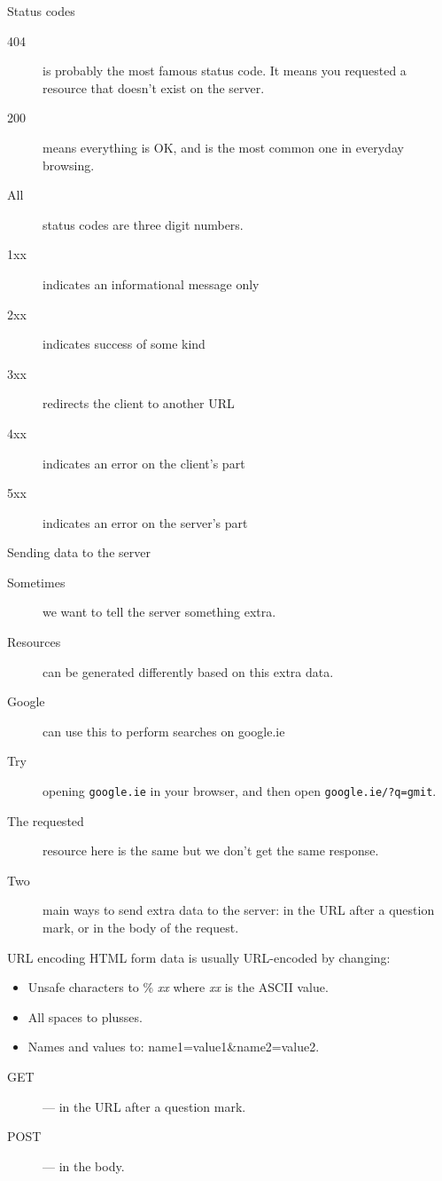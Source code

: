 \begin{frame}{Status codes}
  \begin{description}
    \item[404] is probably the most famous status code. It means you requested a resource that doesn't exist on the server.
    \item[200] means everything is OK, and is the most common one in everyday browsing.
    \item[All] status codes are three digit numbers.
    \item[1xx] indicates an informational message only
    \item[2xx] indicates success of some kind
    \item[3xx] redirects the client to another URL
    \item[4xx] indicates an error on the client's part
    \item[5xx] indicates an error on the server's part
  \end{description}
\end{frame}


\begin{frame}{Sending data to the server}
  \begin{description}
    \item[Sometimes] we want to tell the server something extra.
    \item[Resources] can be generated differently based on this extra data.
    \item[Google] can use this to perform searches on google.ie
    \item[Try] opening \texttt{google.ie} in your browser, and then open \texttt{google.ie/?q=gmit}.
    \item[The requested] resource here is the same but we don't get the same response.
    \item[Two] main ways to send extra data to the server: in the URL after a question mark, or in the body of the request.
  \end{description}
\end{frame}


\begin{frame}{URL encoding}
  HTML form data is usually URL-encoded by changing:
  \begin{itemize}
    \item Unsafe characters to \% \emph{xx} where \emph{xx} is the ASCII value.
    \item All spaces to plusses.
    \item Names and values to: name1=value1\&name2=value2.
  \end{itemize}
  \hr
  \begin{description}
    \item[GET] --- in the URL after a question mark.
    \item[POST] --- in the body.
  \end{description}
\end{frame}

